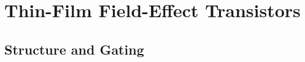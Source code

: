 \documentclass[
  a4paper,
]{scrbook}
\begin{document}
\hypertarget{sec-general-FETs}{%
\section{Thin-Film Field-Effect Transistors}\label{sec-general-FETs}}

\hypertarget{sec-gating}{%
\subsection{Structure and Gating}\label{sec-gating}}

\begin{figure}

\begin{minipage}[t]{0.03\linewidth}

{\centering 


}

\end{minipage}%
%
\begin{minipage}[t]{0.01\linewidth}

{\centering 

~

}

\end{minipage}%
%
\begin{minipage}[t]{0.45\linewidth}

{\centering 

}
\end{minipage}
\end{figure}
\end{document}
